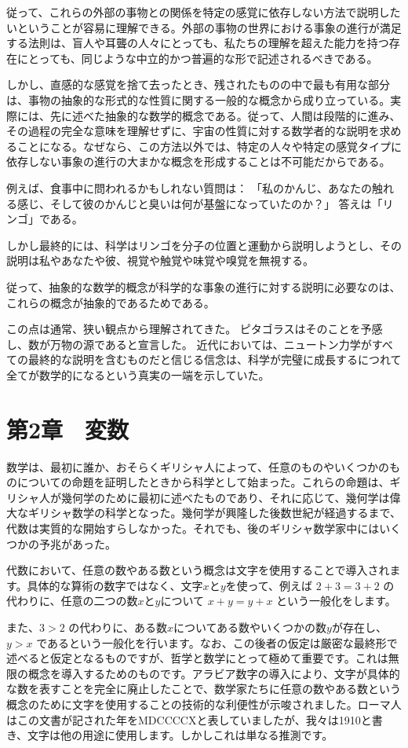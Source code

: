 \documentclass[a4paper,11pt,openany]{ltjsbook}
\begin{document}
従って、これらの外部の事物との関係を特定の感覚に依存しない方法で説明したいということが容易に理解できる。外部の事物の世界における事象の進行が満足する法則は、盲人や耳聾の人々にとっても、私たちの理解を超えた能力を持つ存在にとっても、同じような中立的かつ普遍的な形で記述されるべきである。

しかし、直感的な感覚を捨て去ったとき、残されたものの中で最も有用な部分は、事物の抽象的な形式的な性質に関する一般的な概念から成り立っている。実際には、先に述べた抽象的な数学的概念である。従って、人間は段階的に進み、その過程の完全な意味を理解せずに、宇宙の性質に対する数学者的な説明を求めることになる。なぜなら、この方法以外では、特定の人々や特定の感覚タイプに依存しない事象の進行の大まかな概念を形成することは不可能だからである。

例えば、食事中に問われるかもしれない質問は：
「私のかんじ、あなたの触れる感じ、そして彼のかんじと臭いは何が基盤になっていたのか？」
答えは「リンゴ」である。

しかし最終的には、科学はリンゴを分子の位置と運動から説明しようとし、その説明は私やあなたや彼、視覚や触覚や味覚や嗅覚を無視する。

従って、抽象的な数学的概念が科学的な事象の進行に対する説明に必要なのは、これらの概念が抽象的であるためである。

この点は通常、狭い観点から理解されてきた。
ピタゴラスはそのことを予感し、数が万物の源であると宣言した。
近代においては、ニュートン力学がすべての最終的な説明を含むものだと信じる信念は、科学が完璧に成長するにつれて全てが数学的になるという真実の一端を示していた。

\chapter{第2章　変数}

数学は、最初に誰か、おそらくギリシャ人によって、任意のものやいくつかのものについての命題を証明したときから科学として始まった。これらの命題は、ギリシャ人が幾何学のために最初に述べたものであり、それに応じて、幾何学は偉大なギリシャ数学の科学となった。幾何学が興隆した後数世紀が経過するまで、代数は実質的な開始すらしなかった。それでも、後のギリシャ数学家中にはいくつかの予兆があった。

代数において、任意の数やある数という概念は文字を使用することで導入されます。具体的な算術の数字ではなく、文字$x$と$y$を使って、例えば $2 + 3 = 3 + 2$ の代わりに、任意の二つの数$x$と$y$について $x + y = y + x$ という一般化をします。

また、$3 > 2$ の代わりに、ある数$x$についてある数やいくつかの数$y$が存在し、$y > x$ であるという一般化を行います。なお、この後者の仮定は厳密な最終形で述べると仮定となるものですが、哲学と数学にとって極めて重要です。これは無限の概念を導入するためのものです。アラビア数字の導入により、文字が具体的な数を表すことを完全に廃止したことで、数学家たちに任意の数やある数という概念のために文字を使用することの技術的な利便性が示唆されました。ローマ人はこの文書が記された年をMDCCCCXと表していましたが、我々は1910と書き、文字は他の用途に使用します。しかしこれは単なる推測です。
\end{document}
